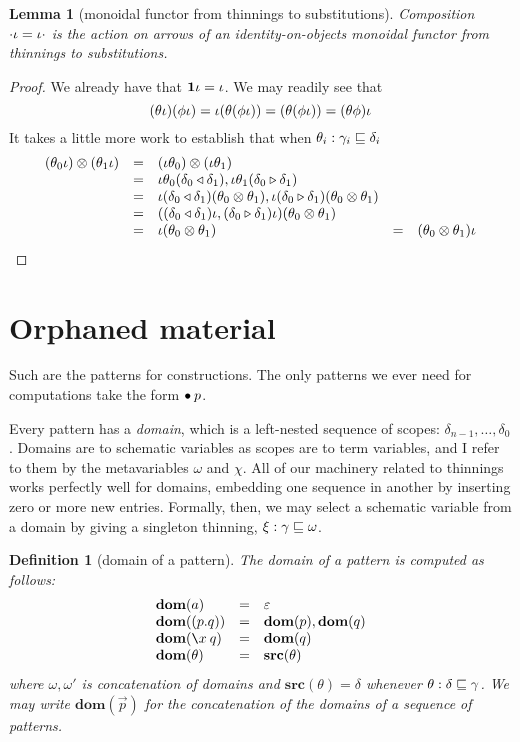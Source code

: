 \documentclass{jfp1}
\newtheorem{lemma}[theorem]{Lemma}
\newtheorem{definition}[theorem]{Definition}
\newcommand{\emp}{\varepsilon}
\begin{document}
\begin{lemma}[monoidal functor from thinnings to substitutions]
  Composition $\cdot\iota = \iota\cdot$ is the action on arrows of an identity-on-objects
  monoidal functor from thinnings to substitutions.
\end{lemma}
\begin{proof}
  We already have that $\mathbf{1}\iota = \iota$. We may readily see that
  \[(\theta\iota)(\phi\iota)=\iota(\theta(\phi\iota))=(\theta(\phi\iota))
    = (\theta\phi)\iota \]
  It takes a little more work to establish that when
  $\theta_i:\gamma_i\sqsubseteq\delta_i$
  \[\begin{array}{lclcl}
    (\theta_0\iota)\otimes(\theta_1\iota) & = &
      (\iota\theta_0)\otimes(\iota\theta_1)\\
    &= &
        \iota\theta_0(\delta_0 \triangleleft \delta_1),\iota\theta_1(\delta_0 \triangleright \delta_1) \\
    &= &
    \iota(\delta_0 \triangleleft \delta_1)(\theta_0\otimes\theta_1), 
    \iota(\delta_0 \triangleright \delta_1)(\theta_0\otimes\theta_1) \\
    &= &
    ((\delta_0 \triangleleft \delta_1)\iota,(\delta_0 \triangleright \delta_1)\iota)(\theta_0\otimes\theta_1) \\
    &= &
    \iota (\theta_0\otimes\theta_1)
    &=&(\theta_0\otimes\theta_1)\iota
    \end{array}\]
\end{proof}


\section{Orphaned material}

Such are the patterns for constructions. The only patterns we ever need for
computations take the form $\bullet\:p$.

Every pattern has a \emph{domain}, which is a left-nested sequence of
scopes: $\delta_{n-1},\ldots,\delta_0$. Domains are to schematic variables
as scopes are to term variables, and I refer to them by the
metavariables $\omega$ and $\chi$. All of our machinery related to thinnings works
perfectly well for domains, embedding one sequence in another by inserting
zero or more new entries. Formally, then, we may select a schematic variable
from a domain by giving a singleton thinning, $\xi : \gamma \sqsubseteq \omega$.

\newcommand{\dom}[1]{\textbf{dom}(#1)}
\newcommand{\src}[1]{\textbf{src}(#1)}
\begin{definition}[domain of a pattern]
  The \emph{domain} of a pattern is computed as follows:
  \[\begin{array}{lcl}
      \dom a & = & \emp \\
      \dom{(p.q)} & = & \dom{p},\dom{q} \\
      \dom{\la xq} & = & \dom{q} \\
      \dom{\theta} & = & \src{\theta}
    \end{array}\]
  where $\omega,\omega'$ is concatenation of domains and $\src{\theta} = \delta$ whenever
  $\theta : \delta\sqsubseteq\gamma$.
  We may write $\dom{\vec p}$ for the concatenation of the domains of a sequence
  of patterns.
\end{definition}
\end{document}
